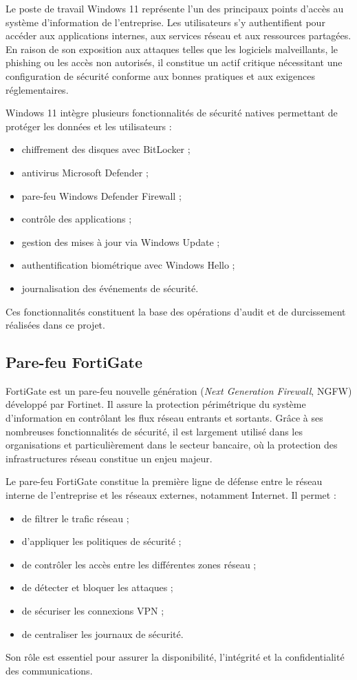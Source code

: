 Le poste de travail Windows 11 représente l'un des principaux points d'accès au système d'information de l'entreprise. Les utilisateurs s'y authentifient pour accéder aux applications internes, aux services réseau et aux ressources partagées. En raison de son exposition aux attaques telles que les logiciels malveillants, le phishing ou les accès non autorisés, il constitue un actif critique nécessitant une configuration de sécurité conforme aux bonnes pratiques et aux exigences réglementaires.

Windows 11 intègre plusieurs fonctionnalités de sécurité natives permettant de protéger les données et les utilisateurs :
\begin{itemize}
  \item chiffrement des disques avec BitLocker ;
  \item antivirus Microsoft Defender ;
  \item pare-feu Windows Defender Firewall ;
  \item contrôle des applications ;
  \item gestion des mises à jour via Windows Update ;
  \item authentification biométrique avec Windows Hello ;
  \item journalisation des événements de sécurité.
\end{itemize}
Ces fonctionnalités constituent la base des opérations d'audit et de durcissement réalisées dans ce projet.

\subsection{Pare-feu FortiGate}

FortiGate est un pare-feu nouvelle génération (\emph{Next Generation Firewall}, NGFW) développé par Fortinet. Il assure la protection périmétrique du système d'information en contrôlant les flux réseau entrants et sortants. Grâce à ses nombreuses fonctionnalités de sécurité, il est largement utilisé dans les organisations et particulièrement dans le secteur bancaire, où la protection des infrastructures réseau constitue un enjeu majeur.

Le pare-feu FortiGate constitue la première ligne de défense entre le réseau interne de l'entreprise et les réseaux externes, notamment Internet. Il permet :
\begin{itemize}
  \item de filtrer le trafic réseau ;
  \item d'appliquer les politiques de sécurité ;
  \item de contrôler les accès entre les différentes zones réseau ;
  \item de détecter et bloquer les attaques ;
  \item de sécuriser les connexions VPN ;
  \item de centraliser les journaux de sécurité.
\end{itemize}
Son rôle est essentiel pour assurer la disponibilité, l'intégrité et la confidentialité des communications.

